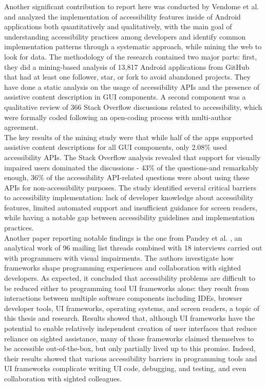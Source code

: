 Another significant contribution to report here was conducted by Vendome et al. \cite{vendome2019can} and analyzed the implementation of accessibility features inside of Android applications both quantitatively and qualitatively, with the main goal of understanding accessibility practices among developers and identify common implementation patterns through a systematic approach, while mining the web to look for data. The methodology of the research contained two major parts: first, they did a mining-based analysis of 13,817 Android applications from GitHub that had at least one follower, star, or fork to avoid abandoned projects. They have done a static analysis on the usage of accessibility APIs and the presence of assistive content description in GUI components. A second component was a qualitative review of 366 Stack Overflow discussions related to accessibility, which were formally coded following an open-coding process with multi-author agreement. \\

The key results of the mining study were that while half of the apps supported assistive content descriptions for all GUI components, only 2.08\% used accessibility APIs. The Stack Overflow analysis revealed that support for visually impaired users dominated the discussions - 43\% of the questions-and remarkably enough, 36\% of the accessibility API-related questions were about using these APIs for non-accessibility purposes. The study identified several critical barriers to accessibility implementation: lack of developer knowledge about accessibility features, limited automated support and insufficient guidance for screen readers, while having a notable gap between accessibility guidelines and implementation practices. \\

Another paper reporting notable findings is the one from Pandey et al. \cite{pandey2022accessibility}, an analytical work of 96 mailing list threads combined with 18 interviews carried out with programmers with visual impairments. The authors investigate how frameworks shape programming experiences and collaboration with sighted developers. As expected, it concluded that accessibility problems are difficult to be reduced either to programming tool UI frameworks alone: they result from interactions between multiple software components including IDEs, browser developer tools, UI frameworks, operating systems, and screen readers, a topic of this thesis and research. Results showed that, although UI frameworks have the potential to enable relatively independent creation of user interfaces that reduce reliance on sighted assistance, many of those frameworks claimed themselves to be accessible out-of-the-box, but only partially lived up to this promise. Indeed, their results showed that various accessibility barriers in programming tools and UI frameworks complicate writing UI code, debugging, and testing, and even collaboration with sighted colleagues. 

